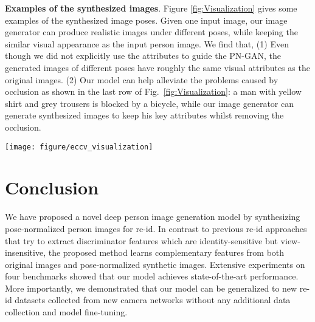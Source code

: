 \documentclass[10pt,letterpaper,twocolumn,10pt,letterpaper,twocolumn]{article}
\begin{document}
\noindent \textbf{Examples of the synthesized images}. Figure \ref{fig:Visualization}
gives some examples of the synthesized image poses. Given one input
image, our image generator can produce realistic images under different
poses, while keeping the similar visual appearance as the input person
image. We find that, (1) Even though we did not explicitly use
the attributes to guide the PN-GAN,  the generated images of different
poses have roughly the same visual attributes as the original
images. (2) Our model can help alleviate the problems caused by occlusion
as shown in the last row of Fig.~\ref{fig:Visualization}: a man with
yellow shirt and grey trousers is blocked by a bicycle, while our image
generator can generate synthesized images to keep his key attributes
whilst removing the occlusion. 
\begin{figure*}
\begin{centering}
\texttt{[image: figure/eccv\_visualization]}\caption{\label{fig:Visualization}Visualization of different poses generated
by PN-GAN model.}
\par\end{centering}
\end{figure*}


\section{Conclusion}

We have proposed a novel deep person image generation model by synthesizing
pose-normalized person images for re-id. In contrast to previous re-id
approaches that try to extract discriminator features which are identity-sensitive
but view-insensitive, the proposed method learns complementary features
from both original images and pose-normalized synthetic images. Extensive
experiments on four benchmarks showed that our model achieves state-of-the-art performance. More importantly, we demonstrated that our model
can be generalized to new re-id datasets collected from new camera
networks without any additional data collection and model fine-tuning.

{\small{}

 }{\small \par}
\end{document}
